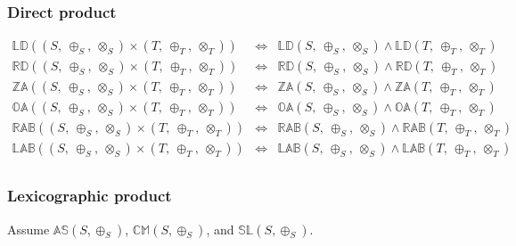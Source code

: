 \documentclass[10pt]{article}
\newcommand{\propname}[1]{{\mathbb{#1}}}
\begin{document}
\subsubsection{Direct product} 

\[
\begin{array}{rcl} 
\propname{LD}((S,\ \oplus_S,\ \otimes_S) \times (T,\ \oplus_T,\ \otimes_T)) 
   & \Leftrightarrow %
   & \propname{LD}(S,\ \oplus_S,\ \otimes_S) \wedge \propname{LD}(T,\ \oplus_T,\ \otimes_T)\\ 
\propname{RD}((S,\ \oplus_S,\ \otimes_S) \times (T,\ \oplus_T,\ \otimes_T)) 
   & \Leftrightarrow %
   & \propname{RD}(S,\ \oplus_S,\ \otimes_S) \wedge \propname{RD}(T,\ \oplus_T,\ \otimes_T) 
  \\ 
\propname{ZA}((S,\ \oplus_S,\ \otimes_S) \times (T,\ \oplus_T,\ \otimes_T)) 
    & \Leftrightarrow %
    & \propname{ZA}(S,\ \oplus_S,\ \otimes_S) \wedge \propname{ZA}(T,\ \oplus_T,\ \otimes_T)
   \\
\propname{OA}((S,\ \oplus_S,\ \otimes_S) \times (T,\ \oplus_T,\ \otimes_T)) 
    & \Leftrightarrow %
    & \propname{OA}(S,\ \oplus_S,\ \otimes_S) \wedge \propname{OA}(T,\ \oplus_T,\ \otimes_T)
   \\
\propname{RAB}((S,\ \oplus_S,\ \otimes_S) \times (T,\ \oplus_T,\ \otimes_T)) 
    & \Leftrightarrow %
    & \propname{RAB}(S,\ \oplus_S,\ \otimes_S) \wedge  \propname{RAB}(T,\ \oplus_T,\ \otimes_T) 
    \\ 
\propname{LAB}((S,\ \oplus_S,\ \otimes_S) \times (T,\ \oplus_T,\ \otimes_T)) 
    & \Leftrightarrow %
    & \propname{LAB}(S,\ \oplus_S,\ \otimes_S) \wedge \propname{LAB}(T,\ \oplus_T,\ \otimes_T)
    \\ 
\end{array} 
\]

\subsubsection{Lexicographic product} 

Assume 
$\propname{AS}(S, \oplus_S)$, 
$\propname{CM}(S, \oplus_S)$,  and 
$\propname{SL}(S, \oplus_S)$. 
\end{document}
